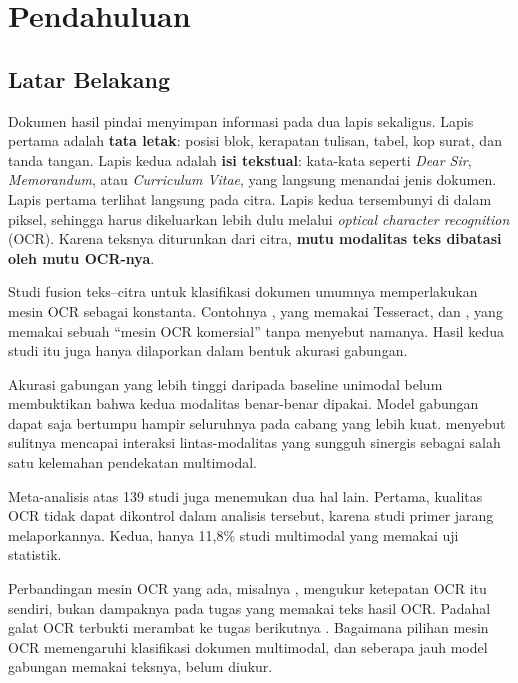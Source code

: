 \section{Pendahuluan}\label{sec:pendahuluan}

\subsection{Latar Belakang}\label{sec:latar-belakang}

Dokumen hasil pindai menyimpan informasi pada dua lapis sekaligus. Lapis pertama adalah
\textbf{tata letak}: posisi blok, kerapatan tulisan, tabel, kop surat, dan tanda tangan.
Lapis kedua adalah \textbf{isi tekstual}: kata-kata seperti \textit{Dear Sir},
\textit{Memorandum}, atau \textit{Curriculum Vitae}, yang langsung menandai jenis
dokumen. Lapis pertama terlihat langsung pada citra. Lapis kedua tersembunyi di dalam
piksel, sehingga harus dikeluarkan lebih dulu melalui \textit{optical character
recognition} (OCR). Karena teksnya diturunkan dari citra, \textbf{mutu modalitas teks
dibatasi oleh mutu OCR-nya}.

Studi fusion teks--citra untuk klasifikasi dokumen umumnya memperlakukan mesin OCR sebagai
konstanta. Contohnya \textcite{audebert2020}, yang memakai Tesseract, dan
\textcite{kashyap2026}, yang memakai sebuah \enquote{mesin OCR komersial} tanpa menyebut
namanya. Hasil kedua studi itu juga hanya dilaporkan dalam bentuk akurasi gabungan.

Akurasi gabungan yang lebih tinggi daripada baseline unimodal belum membuktikan bahwa
kedua modalitas benar-benar dipakai. Model gabungan dapat saja bertumpu hampir seluruhnya
pada cabang yang lebih kuat. \textcite{mironczuk2026} menyebut sulitnya mencapai interaksi
lintas-modalitas yang sungguh sinergis sebagai salah satu kelemahan pendekatan multimodal.

Meta-analisis \textcite{mironczuk2026} atas 139 studi juga menemukan dua hal lain. Pertama,
kualitas OCR tidak dapat dikontrol dalam analisis tersebut, karena studi primer jarang
melaporkannya. Kedua, hanya 11,8\% studi multimodal yang memakai uji statistik.

Perbandingan mesin OCR yang ada, misalnya \textcite{francis2025}, mengukur ketepatan OCR
itu sendiri, bukan dampaknya pada tugas yang memakai teks hasil OCR. Padahal galat OCR
terbukti merambat ke tugas berikutnya \parencite{zhang2025}. Bagaimana pilihan mesin OCR
memengaruhi klasifikasi dokumen multimodal, dan seberapa jauh model gabungan memakai
teksnya, belum diukur.

